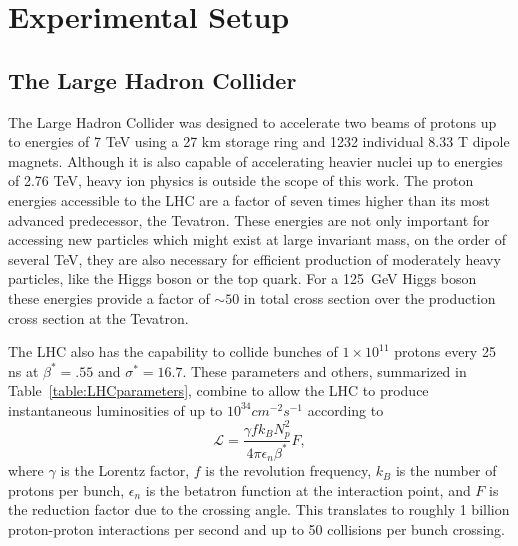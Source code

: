 \newcommand{\microns}{$\mu m$}


\chapter{Experimental Setup}
\label{sec:ExpSetup}


\section{The Large Hadron Collider}
\label{sec:LHC}
The Large Hadron Collider was designed to accelerate two beams of protons up to 
energies of 7 TeV using a 27 km storage ring and  1232 individual 8.33 T dipole magnets. 
Although it is also capable of accelerating heavier nuclei up to energies of 
2.76 TeV, heavy ion physics is outside the scope of this work.  The proton
energies accessible to the LHC are a factor of seven times higher than its
most advanced predecessor, the Tevatron.  These energies are not only 
important for accessing new particles which might exist at large invariant
mass, on the order of several TeV, they are also necessary for efficient 
production of moderately heavy particles, like the Higgs boson or the top 
quark.  For a 125~GeV Higgs boson these energies provide a 
factor of $\sim50$ in total cross section over the production cross section at
the Tevatron.  

The LHC also has the capability to collide bunches of $1\times10^{11}$
protons every 25 ns at $\beta^*=.55$ and $\sigma^*=16.7$.  These
parameters and others, summarized in Table~\ref{table:LHCparameters},
combine to allow the LHC to produce instantaneous luminosities 
of up to $10^{34} cm^{-2}s^{-1}$ according to
\begin{equation}
\mathscr{L} = \frac{\gamma f k_B N_p^2}{4\pi \epsilon_n\beta^*}F,
\end{equation}
where $\gamma$ is the Lorentz factor, $f$ is the revolution frequency,
$k_B$ is the number of protons per bunch, $\epsilon_n$ is the betatron
function at the interaction point, and $F$ is the reduction factor
due to the crossing angle.  This translates to roughly 1 billion 
proton-proton interactions per second and up to 50 collisions per bunch crossing.


